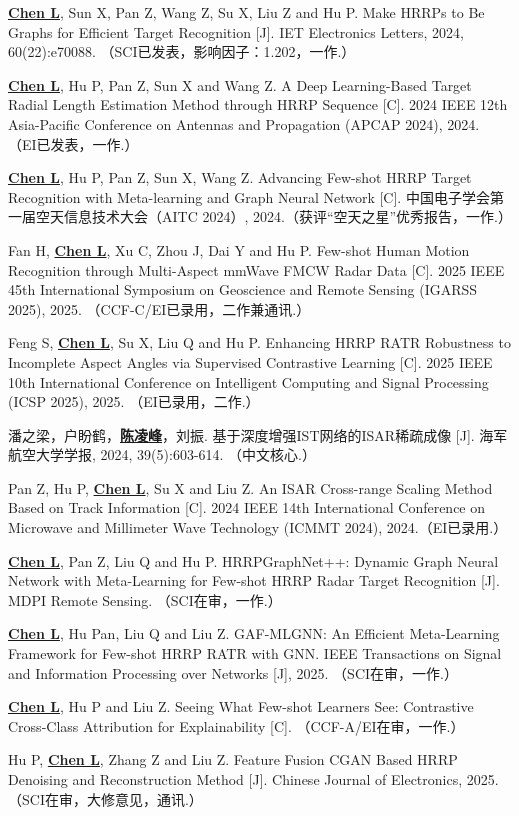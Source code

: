 \begin{resume}
\begin{enumerate}[label={[\arabic*]},itemsep=0pt,parsep=0pt,labelindent=26pt,labelwidth=*,leftmargin=0pt,itemindent=*,align=left]
  \item \textbf{\underline{Chen L}}, Sun X, Pan Z, Wang Z, Su X, Liu Z and Hu P. Make HRRPs to Be Graphs for Efficient Target Recognition [J]. IET Electronics Letters, 2024, 60(22):e70088. （SCI已发表，影响因子：1.202，一作.）
  \item \textbf{\underline{Chen L}}, Hu P, Pan Z, Sun X and Wang Z. A Deep Learning-Based Target Radial Length Estimation Method through HRRP Sequence [C]. 2024 IEEE 12th Asia-Pacific Conference on Antennas and Propagation (APCAP 2024), 2024. （EI已发表，一作.）
  \item \textbf{\underline{Chen L}}, Hu P, Pan Z, Sun X, Wang Z. Advancing Few-shot HRRP Target Recognition with Meta-learning and Graph Neural Network [C]. 中国电子学会第一届空天信息技术大会（AITC 2024）, 2024.（获评“空天之星”优秀报告，一作.）
  \item Fan H, \textbf{\underline{Chen L}}, Xu C, Zhou J, Dai Y and Hu P. Few-shot Human Motion Recognition through Multi-Aspect mmWave FMCW Radar Data [C]. 2025 IEEE 45th International Symposium on Geoscience and Remote Sensing (IGARSS 2025), 2025. （CCF-C/EI已录用，二作兼通讯.）
  \item Feng S, \textbf{\underline{Chen L}}, Su X, Liu Q and Hu P. Enhancing HRRP RATR Robustness to Incomplete Aspect Angles via Supervised Contrastive Learning [C]. 2025 IEEE 10th International Conference on Intelligent Computing and Signal Processing (ICSP 2025), 2025. （EI已录用，二作.）
  \item 潘之梁，户盼鹤，\textbf{\underline{陈凌峰}}，刘振. 基于深度增强IST网络的ISAR稀疏成像 [J]. 海军航空大学学报, 2024, 39(5):603-614. （中文核心.）
  \item Pan Z, Hu P, \textbf{\underline{Chen L}}, Su X and Liu Z. An ISAR Cross-range Scaling Method Based on Track Information [C]. 2024 IEEE 14th International Conference on Microwave and Millimeter Wave Technology (ICMMT 2024), 2024.（EI已录用.）
  \item \textbf{\underline{Chen L}}, Pan Z, Liu Q and Hu P. HRRPGraphNet++: Dynamic Graph Neural Network with Meta-Learning for Few-shot HRRP Radar Target Recognition [J]. MDPI Remote Sensing. （SCI在审，一作.）
  \item \textbf{\underline{Chen L}}, Hu Pan, Liu Q and Liu Z. GAF-MLGNN: An Efficient Meta-Learning Framework for Few-shot HRRP RATR with GNN. IEEE Transactions on Signal and Information Processing over Networks [J], 2025. （SCI在审，一作.）
  \item \textbf{\underline{Chen L}}, Hu P and Liu Z. Seeing What Few-shot Learners See: Contrastive Cross-Class Attribution for Explainability [C]. （CCF-A/EI在审，一作.）
  \item Hu P, \textbf{\underline{Chen L}}, Zhang Z and Liu Z. Feature Fusion CGAN Based HRRP Denoising and Reconstruction Method [J]. Chinese Journal of Electronics, 2025. （SCI在审，大修意见，通讯.）
  \end{enumerate}


\end{resume}
